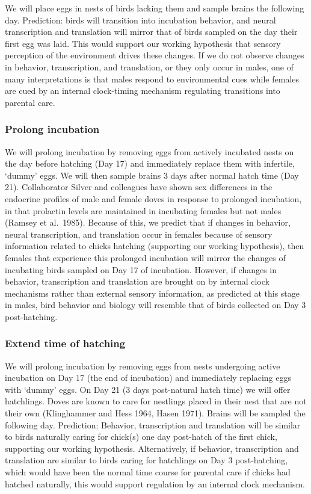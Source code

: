 \documentclass[10pt,letterpaper]{article}
\begin{document}
We will place eggs in nests of birds lacking them and sample brains the
following day. Prediction: birds will transition into incubation
behavior, and neural transcription and translation will mirror that of
birds sampled on the day their first egg was laid. This would support
our working hypothesis that sensory perception of the environment drives
these changes. If we do not observe changes in behavior, transcription,
and translation, or they only occur in males, one of many
interpretations is that males respond to environmental cues while
females are cued by an internal clock-timing mechanism regulating
transitions into parental care.

\hypertarget{prolong-incubation}{%
\subsubsection{Prolong incubation}\label{prolong-incubation}}

We will prolong incubation by removing eggs from actively incubated
nests on the day before hatching (Day 17) and immediately replace them
with infertile, `dummy' eggs. We will then sample brains 3 days after
normal hatch time (Day 21). Collaborator Silver and colleagues have
shown sex differences in the endocrine profiles of male and female doves
in response to prolonged incubation, in that prolactin levels are
maintained in incubating females but not males (Ramsey et al.~1985).
Because of this, we predict that if changes in behavior, neural
transcription, and translation occur in females because of sensory
information related to chicks hatching (supporting our working
hypothesis), then females that experience this prolonged incubation will
mirror the changes of incubating birds sampled on Day 17 of incubation.
However, if changes in behavior, transcription and translation are
brought on by internal clock mechanisms rather than external sensory
information, as predicted at this stage in males, bird behavior and
biology will resemble that of birds collected on Day 3 post-hatching.

\hypertarget{extend-time-of-hatching}{%
\subsubsection{Extend time of hatching}\label{extend-time-of-hatching}}

We will prolong incubation by removing eggs from nests undergoing active
incubation on Day 17 (the end of incubation) and immediately replacing
eggs with `dummy' eggs. On Day 21 (3 days post-natural hatch time) we
will offer hatchlings. Doves are known to care for nestlings placed in
their nest that are not their own (Klinghammer and Hess 1964, Hasen
1971). Brains will be sampled the following day. Prediction: Behavior,
transcription and translation will be similar to birds naturally caring
for chick(s) one day post-hatch of the first chick, supporting our
working hypothesis. Alternatively, if behavior, transcription and
translation are similar to birds caring for hatchlings on Day 3
post-hatching, which would have been the normal time course for parental
care if chicks had hatched naturally, this would support regulation by
an internal clock mechanism.
\end{document}
